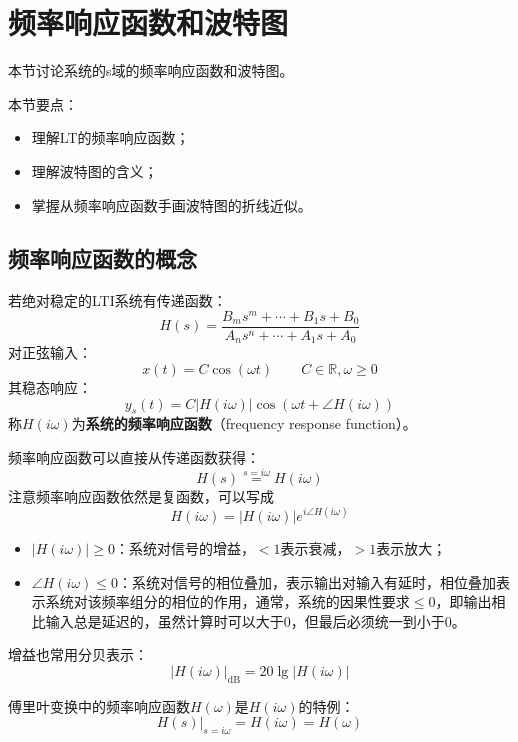 \section{频率响应函数和波特图}

本节讨论系统的s域的频率响应函数和波特图。

本节要点：
\begin{itemize}
    \item 理解LT的频率响应函数；
    \item 理解波特图的含义；
    \item 掌握从频率响应函数手画波特图的折线近似。
\end{itemize}

\subsection{频率响应函数的概念}

\begin{definition}[频率响应函数]
若绝对稳定的LTI系统有传递函数：
\[
H\left( s \right) =\frac{B_ms^m+\cdots +B_1s+B_0}{A_ns^n+\cdots +A_1s+A_0}
\]
对正弦输入：
\[
x\left( t \right) =C\cos \left( \omega t \right) \qquad C\in \mathbb{R} ,\omega \geqslant 0
\]
其稳态响应：
\[
y_s\left( t \right) =C\left| H\left( i\omega \right) \right|\cos \left( \omega t+\angle H\left( i\omega \right) \right)
\]
称$H\left( i\omega \right) $为{\bf 系统的频率响应函数}（frequency response function）。
\end{definition}

频率响应函数可以直接从传递函数获得：
\[
H\left( s \right) \overset{s=i\omega}{=}H\left( i\omega \right)
\]
注意频率响应函数依然是复函数，可以写成
\[
H\left( i\omega \right) =\left| H\left( i\omega \right) \right|e^{i\angle H\left( i\omega \right) }
\]
\begin{itemize}
    \item $\left| H\left( i\omega \right) \right|\geqslant 0$：系统对信号的增益，$<1$表示衰减，$>1$表示放大；
    \item $\angle H\left( i\omega \right) \leqslant 0$：系统对信号的相位叠加，表示输出对输入有延时，相位叠加表示系统对该频率组分的相位的作用，通常，系统的因果性要求$\leqslant 0$，即输出相比输入总是延迟的，虽然计算时可以大于0，但最后必须统一到小于0。
\end{itemize}
增益也常用分贝表示：
\[
\left| H\left( i\omega \right) \right|_{\mathrm{dB}}=20\lg \left| H\left( i\omega \right) \right|
\]

\begin{tcolorbox}
傅里叶变换中的频率响应函数$H\left( \omega \right) $是$H\left( i\omega \right) $的特例：
\[
\left. H\left( s \right) \right|_{s=i\omega}=H\left( i\omega \right) =H\left( \omega \right)
\]
\end{tcolorbox}

